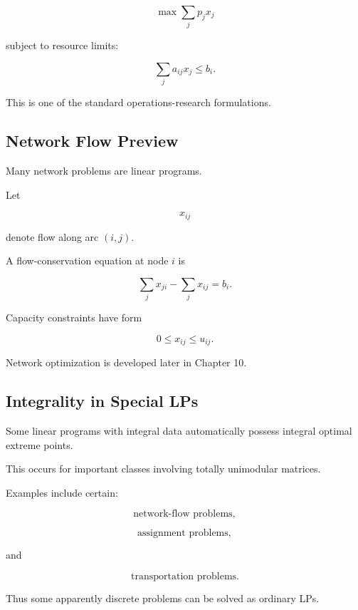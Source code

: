 \[
\boxed{
\max
\sum_j
p_jx_j
}
\]

subject to resource limits:

\[
\boxed{
\sum_j
a_{ij}x_j
\leq
b_i.
}
\]

This is one of the standard operations-research formulations.

\subsection{Network Flow Preview}
\label{subsec:network-flow-lp-preview}

Many network problems are linear programs.

Let

\[
x_{ij}
\]

denote flow along arc \((i,j)\).

A flow-conservation equation at node \(i\) is

\[
\boxed{
\sum_j
x_{ji}
-
\sum_j
x_{ij}
=
b_i.
}
\]

Capacity constraints have form

\[
\boxed{
0\leq x_{ij}\leq u_{ij}.
}
\]

Network optimization is developed later in Chapter 10.

\subsection{Integrality in Special LPs}
\label{subsec:special-lp-integrality}

Some linear programs with integral data automatically possess integral
optimal extreme points.

This occurs for important classes involving totally unimodular matrices.

Examples include certain:

\[
\boxed{
\text{network-flow problems},
}
\]

\[
\boxed{
\text{assignment problems},
}
\]

and

\[
\boxed{
\text{transportation problems}.
}
\]

Thus some apparently discrete problems can be solved as ordinary LPs.

